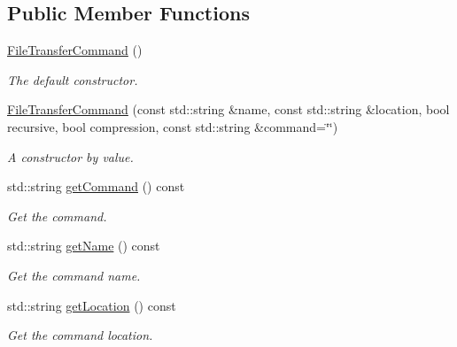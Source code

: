 \subsection*{Public Member Functions}
\begin{DoxyCompactItemize}
\item 
\hypertarget{classFileTransferCommand_a1bd6d67d8dab9fbe9ac45ad7cc6b3707}{
\hyperlink{classFileTransferCommand_a1bd6d67d8dab9fbe9ac45ad7cc6b3707}{FileTransferCommand} ()}
\label{classFileTransferCommand_a1bd6d67d8dab9fbe9ac45ad7cc6b3707}

\begin{DoxyCompactList}\small\item\em The default constructor. \item\end{DoxyCompactList}\item 
\hyperlink{classFileTransferCommand_a74c352bc2fb6d39bc87bcaf972dafa89}{FileTransferCommand} (const std::string \&name, const std::string \&location, bool recursive, bool compression, const std::string \&command=\char`\"{}\char`\"{})
\begin{DoxyCompactList}\small\item\em A constructor by value. \item\end{DoxyCompactList}\item 
std::string \hyperlink{classFileTransferCommand_a64a77c5e49a2faae086802aca2163d5f}{getCommand} () const 
\begin{DoxyCompactList}\small\item\em Get the command. \item\end{DoxyCompactList}\item 
std::string \hyperlink{classFileTransferCommand_ac28a940ff8a4c503dc47adcae3d166e9}{getName} () const 
\begin{DoxyCompactList}\small\item\em Get the command name. \item\end{DoxyCompactList}\item 
std::string \hyperlink{classFileTransferCommand_ab1339f210f556005ecf1528b7f0d0836}{getLocation} () const 
\begin{DoxyCompactList}\small\item\em Get the command location. \item\end{DoxyCompactList}\item 

\end{DoxyCompactItemize}
